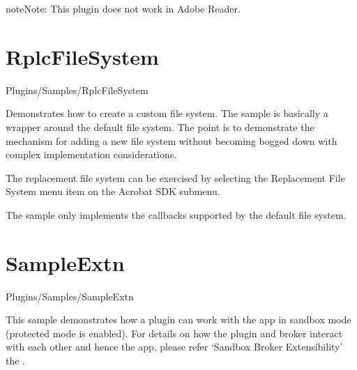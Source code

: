\documentclass[letterpaper,12pt,english,openany,oneside]{sphinxmanual}
\begin{document}
\begin{sphinxadmonition}{note}{Note:}
This plugin does not work in Adobe Reader.
\end{sphinxadmonition}


\section{RplcFileSystem}
\label{\detokenize{Samples_Plug_in:rplcfilesystem}}\label{\detokenize{Samples_Plug_in:location-7}}

Plugins/Samples/RplcFileSystem

\label{\detokenize{Samples_Plug_in:description-7}}

Demonstrates how to create a custom file system. The sample is basically a wrapper around the default file system. The point is to demonstrate the mechanism for adding a new file system without becoming bogged down with complex implementation considerations.

\label{\detokenize{Samples_Plug_in:usage-5}}

The replacement file system can be exercised by selecting the Replacement File System menu item on the Acrobat SDK submenu.

\label{\detokenize{Samples_Plug_in:implementation-details-2}}

The sample only implements the callbacks supported by the default file system.


\section{SampleExtn}
\label{\detokenize{Samples_Plug_in:sampleextn}}\label{\detokenize{Samples_Plug_in:location-8}}

Plugins/Samples/SampleExtn

\label{\detokenize{Samples_Plug_in:description-8}}

This sample demonstrates how a plugin can work with the app in sandbox mode (protected mode is enabled). For details on how the plugin and broker interact with each other and hence the app, please refer ‘Sandbox Broker Extensibility’ the  .
\end{document}
